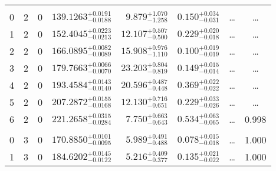 \begin{table*}[!]
\begin{tabular}{llcrrlrc}
\hline \\[-8pt]
0 & 2 & 0 & $    139.1263_{-      0.0188}^{+      0.0191}$ & $       9.879_{-       1.258}^{+       1.070}$ & $       0.150_{-       0.031}^{+       0.034}$ & \multicolumn{1}{c}{\dots} & \dots \\[1pt]
1 & 2 & 0 & $    152.4045_{-      0.0213}^{+      0.0223}$ & $      12.107_{-       0.500}^{+       0.507}$ & $       0.229_{-       0.018}^{+       0.020}$ & \multicolumn{1}{c}{\dots} & \dots \\[1pt]
2 & 2 & 0 & $    166.0895_{-      0.0089}^{+      0.0082}$ & $      15.908_{-       1.110}^{+       0.976}$ & $       0.100_{-       0.019}^{+       0.019}$ & \multicolumn{1}{c}{\dots} & \dots \\[1pt]
3 & 2 & 0 & $    179.7663_{-      0.0070}^{+      0.0066}$ & $      23.203_{-       0.819}^{+       0.804}$ & $       0.149_{-       0.014}^{+       0.015}$ & \multicolumn{1}{c}{\dots} & \dots \\[1pt]
4 & 2 & 0 & $    193.4584_{-      0.0140}^{+      0.0143}$ & $      20.596_{-       0.448}^{+       0.487}$ & $       0.369_{-       0.022}^{+       0.022}$ & \multicolumn{1}{c}{\dots} & \dots \\[1pt]
5 & 2 & 0 & $    207.2872_{-      0.0168}^{+      0.0155}$ & $      12.130_{-       0.651}^{+       0.716}$ & $       0.229_{-       0.026}^{+       0.033}$ & \multicolumn{1}{c}{\dots} & \dots \\[1pt]
6 & 2 & 0 & $    221.2658_{-      0.0284}^{+      0.0315}$ & $       7.750_{-       0.643}^{+       0.663}$ & $       0.534_{-       0.065}^{+       0.063}$ & \multicolumn{1}{c}{\dots} & 0.998\\[1pt]
\hline \\[-8pt]
0 & 3 & 0 & $    170.8850_{-      0.0095}^{+      0.0101}$ & $       5.989_{-       0.488}^{+       0.491}$ & $       0.078_{-       0.018}^{+       0.015}$ & \multicolumn{1}{c}{\dots} & 1.000 \\[1pt]
1 & 3 & 0 & $    184.6202_{-      0.0122}^{+      0.0145}$ & $       5.216_{-       0.377}^{+       0.409}$ & $       0.135_{-       0.022}^{+       0.021}$ & \multicolumn{1}{c}{\dots} & 1.000 \\[1pt]
\hline
\end{tabular}
\end{table*}